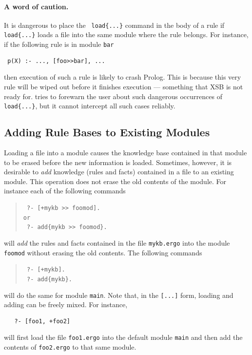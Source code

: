 \documentclass[11pt]{article}
\newcommand{\ERGO}{\mbox{\smaller{\ensuremath{\cal{E}}\smaller{{\sc{RGO}}}}}\xspace}
\newcommand{\FLSYSTEM}{\ERGO}
\newcommand{\ergoext}{ergo\xspace}
\begin{document}
\paragraph{A word of caution.} It is dangerous to place the {\tt
  load\{...\}} command
in the body of a rule if {\tt load\{...\}} loads a file into the same module
where the rule belongs. For instance, if the following rule is in module
{\tt bar}  
\begin{verbatim}
 p(X) :- ..., [foo>>bar], ...  
\end{verbatim}
then execution of such a rule is likely to crash Prolog. This is because
this very rule will be wiped out before it finishes execution --- something
that XSB is not ready for. \FLSYSTEM tries to forewarn the user about such
dangerous occurrences of {\tt load\{...\}}, but it cannot intercept all such
cases reliably.


\subsection{Adding Rule Bases to Existing Modules}\label{sec-adding-to-mod}

Loading a file into a module causes the knowledge base contained in that
module to be erased before the new information is loaded. Sometimes,
however, it is desirable to \emph{add} knowledge (rules and facts)
contained in a file to an existing module.
This operation does not erase the old contents of the module.
For instance each of the following commands 

\index{[+file]}
\begin{quote}
  \tt
   ?- [+mykb >{}> foomod].\\
   or
   \\
    \tt
   ?- add\{mykb >{}> foomod\}.
\end{quote}
will \emph{add} the rules and facts contained in the file {\tt mykb.\ergoext} into the
module {\tt foomod} without erasing the old contents. The following commands
\begin{quote}
  \tt
   ?- [+mykb].\\
    \tt
   ?- add\{mykb\}.
\end{quote}
will do the same for module {\tt main}. Note that, in the {\tt [...]} form,  
loading and adding can be freely mixed. For instance, 
\begin{verbatim}
   ?- [foo1, +foo2]  
\end{verbatim}
will first load the file {\tt foo1.\ergoext} into the default module {\tt main}
and then add the contents of {\tt foo2.\ergoext} to that same module.
\end{document}
